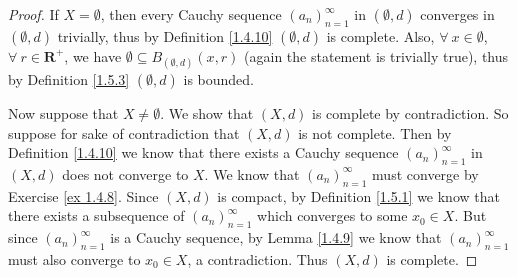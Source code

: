\begin{proof}
    If \(X = \emptyset\), then every Cauchy sequence \((a_n)_{n = 1}^\infty\) in \((\emptyset, d)\) converges in \((\emptyset, d)\) trivially, thus by Definition \ref{1.4.10} \((\emptyset, d)\) is complete.
    Also, \(\forall\ x \in \emptyset\), \(\forall\ r \in \mathbf{R}^+\), we have \(\emptyset \subseteq B_{(\emptyset, d)}(x, r)\) (again the statement is trivially true), thus by Definition \ref{1.5.3} \((\emptyset, d)\) is bounded.

    Now suppose that \(X \neq \emptyset\).
    We show that \((X, d)\) is complete by contradiction.
    So suppose for sake of contradiction that \((X, d)\) is not complete.
    Then by Definition \ref{1.4.10} we know that there exists a Cauchy sequence \((a_n)_{n = 1}^\infty\) in \((X, d)\) does not converge to \(X\).
    We know that \((a_n)_{n = 1}^\infty\) must converge by Exercise \ref{ex 1.4.8}.
    Since \((X, d)\) is compact, by Definition \ref{1.5.1} we know that there exists a subsequence of \((a_n)_{n = 1}^\infty\) which converges to some \(x_0 \in X\).
    But since \((a_n)_{n = 1}^\infty\) is a Cauchy sequence, by Lemma \ref{1.4.9} we know that \((a_n)_{n = 1}^\infty\) must also converge to \(x_0 \in X\), a contradiction.
    Thus \((X, d)\) is complete.


\end{proof}
